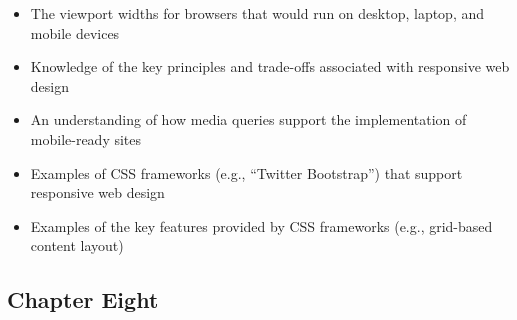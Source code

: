 \documentclass[11pt]{article}
\begin{document}
\begin{itemize}
  \item The viewport widths for browsers that would run on desktop, laptop, and
    mobile devices

  \item Knowledge of the key principles and trade-offs associated with
    responsive web design

  \item An understanding of how media queries support the implementation of
    mobile-ready sites

  \item Examples of CSS frameworks (e.g., ``Twitter Bootstrap'') that support
    responsive web design

  \item Examples of the key features provided by CSS frameworks (e.g.,
    grid-based content layout)

\end{itemize}

\vspace*{-.2in}
\subsection*{Chapter Eight}
\end{document}
